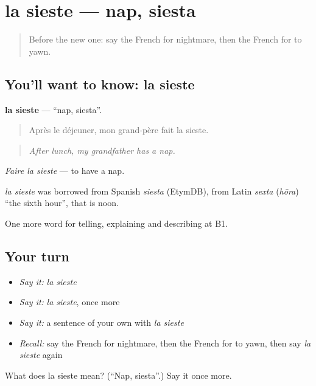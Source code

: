 \section[la sieste]{la sieste — nap, siesta}

\label{lesson:FR-C486-sieste}



\begin{quote}
Before the new one: say the French for nightmare, then the French for to yawn.
\end{quote}

\subsection*{You'll want to know: la sieste}
\textbf{la sieste} — \textquotedblleft{}nap, siesta\textquotedblright{}.

\begin{quote}
Après le déjeuner, mon grand-père fait la sieste.
\end{quote}

\begin{quote}
\emph{After lunch, my grandfather has a nap.}
\end{quote}

\emph{Faire la sieste} — to have a nap.

\begin{cousinweb}
\emph{la sieste} was borrowed from Spanish \emph{siesta} (EtymDB), from Latin \emph{sexta} (\emph{hōra}) \textquotedblleft{}the sixth hour\textquotedblright{}, that is noon.
\end{cousinweb}

\begin{grammarlens}[title={What you've built}]
One more word for telling, explaining and describing at B1.
\end{grammarlens}

\subsection*{Your turn}
\begin{itemize}
\raggedright
  \item \emph{Say it:} \emph{la sieste}
  \item \emph{Say it:} \emph{la sieste}, once more
  \item \emph{Say it:} a sentence of your own with \emph{la sieste}
  \item \emph{Recall:} say the French for nightmare, then the French for to yawn, then say \emph{la sieste} again
\end{itemize}

\begin{tcolorbox}[breakable,colback=teal!4,colframe=teal!35!black,title={Before you move on}]
What does la sieste mean? (\textquotedblleft{}Nap, siesta\textquotedblright{}.) Say it once more.
\end{tcolorbox}
